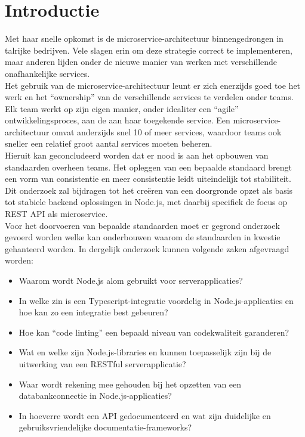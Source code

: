 
\section{Introductie} %
\label{sec:introductie}

Met haar snelle opkomst is de microservice-architectuur binnengedrongen in talrijke bedrijven. Vele slagen erin om deze strategie correct te implementeren, maar anderen lijden onder de nieuwe manier van werken met verschillende onafhankelijke services. \\
Het gebruik van de microservice-architectuur leunt er zich enerzijds goed toe het werk en het “ownership” van de verschillende services te verdelen onder teams. Elk team werkt op zijn eigen manier, onder idealiter een “agile” ontwikkelingsproces, aan de aan haar toegekende service. Een microservice-architectuur omvat anderzijds snel 10 of meer services, waardoor teams ook sneller een relatief groot aantal services moeten beheren. \\
Hieruit kan geconcludeerd worden dat er nood is aan het opbouwen van standaarden overheen teams. Het opleggen van een bepaalde standaard brengt een vorm van consistentie en meer consistentie leidt uiteindelijk tot stabiliteit. Dit onderzoek zal bijdragen tot het creëren van een doorgronde opzet als basis tot stabiele backend oplossingen in Node.js, met daarbij specifiek de focus op REST API als microservice. \\
Voor het doorvoeren van bepaalde standaarden moet er gegrond onderzoek gevoerd worden welke kan onderbouwen waarom de standaarden in kwestie gehanteerd worden. In dergelijk onderzoek kunnen volgende zaken afgevraagd worden: \\

\begin{itemize}
  \item Waarom wordt Node.js alom gebruikt voor serverapplicaties?
  \item In welke zin is een Typescript-integratie voordelig in Node.js-applicaties en hoe kan zo een integratie best gebeuren?
  \item Hoe kan “code linting” een bepaald niveau van codekwaliteit garanderen?
  \item Wat en welke zijn Node.js-libraries en kunnen toepasselijk zijn bij de uitwerking van een RESTful serverapplicatie?
  \item Waar wordt rekening mee gehouden bij het opzetten van een databankconnectie in Node.js-applicaties?
  \item In hoeverre wordt een API gedocumenteerd en wat zijn duidelijke en gebruiksvriendelijke documentatie-frameworks?
\end{itemize}

